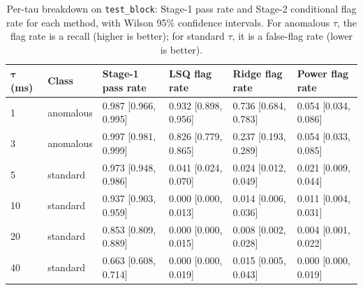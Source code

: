 \begin{table}[htbp]
    \centering
    \caption{Per-tau breakdown on \texttt{test\_block}: Stage-1 pass rate and Stage-2 conditional flag rate for each method, with Wilson 95\% confidence intervals. For anomalous $\tau$, the flag rate is a recall (higher is better); for standard $\tau$, it is a false-flag rate (lower is better).}
    \label{tab:per_tau}
    \begin{tabular}{@{}llllll@{}}
        \toprule
        $\boldsymbol{\tau}$ \textbf{(ms)} & \textbf{Class} & \textbf{Stage-1 pass rate} & \textbf{LSQ flag rate} & \textbf{Ridge flag rate} & \textbf{Power flag rate} \\
        \midrule
        1 & anomalous & 0.987 [0.966, 0.995] & 0.932 [0.898, 0.956] & 0.736 [0.684, 0.783] & 0.054 [0.034, 0.086] \\
        3 & anomalous & 0.997 [0.981, 0.999] & 0.826 [0.779, 0.865] & 0.237 [0.193, 0.289] & 0.054 [0.033, 0.085] \\
        5 & standard & 0.973 [0.948, 0.986] & 0.041 [0.024, 0.070] & 0.024 [0.012, 0.049] & 0.021 [0.009, 0.044] \\
        10 & standard & 0.937 [0.903, 0.959] & 0.000 [0.000, 0.013] & 0.014 [0.006, 0.036] & 0.011 [0.004, 0.031] \\
        20 & standard & 0.853 [0.809, 0.889] & 0.000 [0.000, 0.015] & 0.008 [0.002, 0.028] & 0.004 [0.001, 0.022] \\
        40 & standard & 0.663 [0.608, 0.714] & 0.000 [0.000, 0.019] & 0.015 [0.005, 0.043] & 0.000 [0.000, 0.019] \\
        \bottomrule
    \end{tabular}
\end{table}